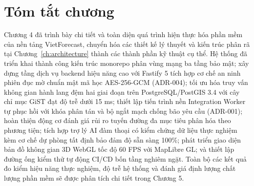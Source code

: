 \section{Tóm tắt chương}
\label{sec:chapter4_summary}
Chương 4 đã trình bày chi tiết và toàn diện quá trình hiện thực hóa phần mềm của nền tảng VietForecast, chuyển hóa các thiết kế lý thuyết và kiến trúc phân rã tại Chương~\ref{ch:architecture} thành các thành phần kỹ thuật cụ thể. Hệ thống đã triển khai thành công kiến trúc monorepo phân vùng mạng ba tầng bảo mật; xây dựng tầng dịch vụ backend hiệu năng cao với Fastify 5 tích hợp cơ chế an ninh phiên đục mờ chuẩn mật mã học AES-256-GCM (ADR-004); tối ưu hóa truy vấn không gian hành lang đệm hai giai đoạn trên PostgreSQL/PostGIS 3.4 với cây chỉ mục GiST đạt độ trễ dưới 15 ms; thiết lập tiến trình nền Integration Worker tự phục hồi với khóa phân tán và bộ ngắt mạch chống bão yêu cầu (ADR-001); hoàn thiện động cơ đánh giá rủi ro tuyến đường đa mục tiêu phân hóa theo phương tiện; tích hợp trợ lý AI đàm thoại có kiểm chứng dữ liệu thực nghiệm kèm cơ chế dự phòng tất định bảo đảm độ sẵn sàng 100\%; phát triển giao diện bản đồ không gian 3D WebGL tốc độ 60 FPS với MapLibre GL; và thiết lập đường ống kiểm thử tự động CI/CD bốn tầng nghiêm ngặt. Toàn bộ các kết quả đo kiểm hiệu năng thực nghiệm, độ trễ hệ thống và đánh giá định lượng chất lượng phần mềm sẽ được phân tích chi tiết trong Chương 5.
